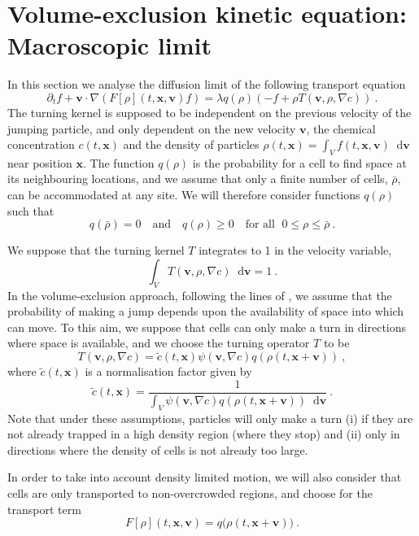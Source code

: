 \documentclass[review,onefignum,onetabnum]{siamart220329}
\newcommand*\diff{\mathop{}\!\mathrm{d}}
\begin{document}
\section{Volume-exclusion kinetic equation: Macroscopic limit}
\label{sec:model}
In this section we analyse the diffusion limit of the following transport equation
\begin{equation*}
    \partial_t f+\mathbf{v}\cdot \nabla(F[\rho](t,\mathbf{x},\mathbf{v}) f)= \lambda q(\rho)(-f+\rho T(\mathbf{v},\rho,\nabla c))\ .
\end{equation*}
The turning kernel is supposed to be independent on the previous velocity of the jumping particle, and only dependent on the new velocity $\mathbf{v}$, the chemical concentration $c(t,\mathbf{x})$ and the density of particles $\rho(t,\mathbf{x})=\int_V f(t,\textbf{x},\mathbf{v})\diff \mathbf{v}$ near position $\mathbf{x}$.
\noindent The function $q(\rho)$ is the probability {for a cell to find} space at its neighbouring locations, and we assume that only a finite number of cells, $\bar{\rho}$, can be accommodated at any site. We will therefore consider functions $q(\rho)$ such that
$$
q(\bar{\rho}) = 0 \quad \text{and} \quad q(\rho) \geq 0 \quad \text{for all } \; 0\leq \rho \leq \bar{\rho}\ .
$$

We {suppose that the turning kernel $T$ integrates to 1 in the velocity variable},
$$
\int_V T(\textbf{v},\rho,\nabla c)\diff \mathbf{v}=1\ .
$$
In the volume-exclusion approach, following the lines of \cite{Hillen2009}, we assume that the probability of making a jump depends upon the availability of space into which {\color{red}{a cell}} can move. To this aim, we suppose that cells can only make a turn in directions where space is available, and we choose the turning operator $T$ to be
\begin{equation*}
    T(\mathbf{v},\rho,\nabla c)=\tilde{c}(t,\mathbf{x})\psi(\mathbf{v},\nabla c) q(\rho(t,\mathbf{x}+ \mathbf{v}))\ ,
\end{equation*}
\noindent where $\tilde{c}(t,\mathbf{x})$ is a normalisation factor given by
\[
\tilde{c}(t,\mathbf{x})=\frac{1}{\displaystyle\int_{V} \psi(\mathbf{v},\nabla c) q(\rho(t,\mathbf{x}+ \mathbf{v}))\diff \mathbf{v} }\ .
\]
\noindent Note that under these assumptions, particles will only make a turn (i) if they are not already trapped in a high density region (where they stop) and (ii) only in directions where the density of cells is not already too large. 

In order to take into account density limited motion, we will also consider that cells are only transported to non-overcrowded regions, and choose for the transport term
\begin{equation*}
F[\rho](t,\mathbf{x},\mathbf{v}) = q\big(\rho(t,\mathbf{x}+\mathbf{v})\big)\ .
\end{equation*}
\end{document}
